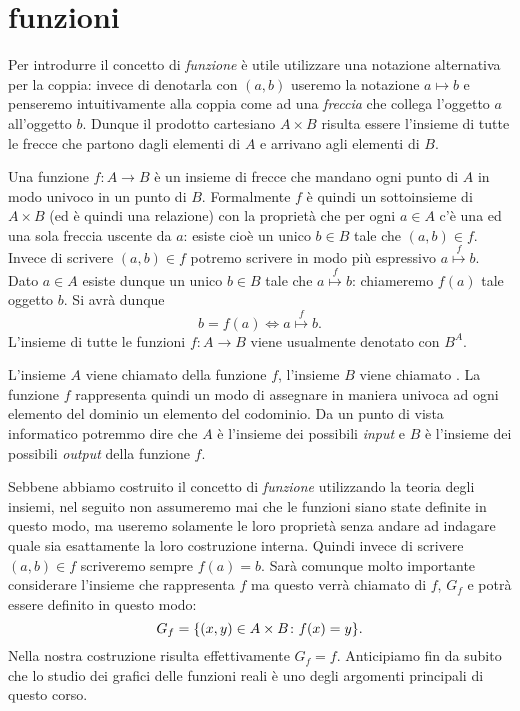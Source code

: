 \section{funzioni}

Per introdurre il concetto di \emph{funzione} è utile
utilizzare una notazione alternativa per la coppia: invece di denotarla
con $(a,b)$ useremo la notazione $a \mapsto b$ e penseremo intuitivamente
alla coppia come ad una \emph{freccia} che collega l'oggetto $a$
all'oggetto $b$. 
Dunque il prodotto cartesiano
$A\times B$ risulta essere l'insieme di tutte le frecce che partono dagli
elementi di $A$ e arrivano agli elementi di $B$.

Una funzione $f\colon A \to B$ è un insieme di frecce che mandano
ogni punto di $A$ in modo univoco in un punto di $B$. Formalmente
$f$ è quindi un sottoinsieme di $A\times B$
(ed è quindi una relazione) con la proprietà che
per ogni $a\in A$ c'è una ed una sola freccia uscente da $a$:
esiste cioè un unico $b\in B$ tale che $(a,b)\in f$.
Invece di scrivere $(a,b)\in f$ potremo scrivere in modo più espressivo
$a\stackrel f \mapsto b$.
Dato $a\in A$ esiste dunque un unico $b\in B$ tale che
$a\stackrel f \mapsto b$: chiameremo $f(a)$ tale oggetto $b$.
Si avrà dunque
\[
 b=f(a) \iff a\stackrel f \mapsto b.
\]
L'insieme di tutte le funzioni $f\colon A\to B$ viene usualmente denotato con $B^A$.
%
%
%

L'insieme $A$ viene chiamato  della funzione $f$,
l'insieme $B$ viene chiamato .
La funzione $f$ rappresenta quindi un modo di assegnare in maniera univoca
ad ogni elemento del dominio un elemento del codominio.
Da un punto di vista informatico potremmo dire che $A$ è l'insieme
dei possibili \emph{input} e $B$ è l'insieme dei possibili \emph{output}
della funzione $f$.

Sebbene abbiamo costruito il concetto di \emph{funzione} utilizzando la teoria
degli insiemi, nel seguito non assumeremo mai che le funzioni siano state definite
in questo modo, ma useremo solamente le loro proprietà senza andare ad indagare
quale sia esattamente la loro costruzione interna.
Quindi invece di scrivere $(a,b)\in f$ scriveremo sempre $f(a)=b$.
Sarà comunque molto importante
considerare l'insieme che rappresenta $f$ ma questo verrà chiamato
 di $f$, $G_f$ e potrà essere definito in questo modo:
\[
  G_f = {\left\{ (x,y)\in A \times B\colon f(x)=y \right\}}.
\]
Nella nostra costruzione risulta effettivamente $G_f = f$.
Anticipiamo fin da subito che lo studio dei grafici delle funzioni reali è
uno degli argomenti principali di questo corso.

